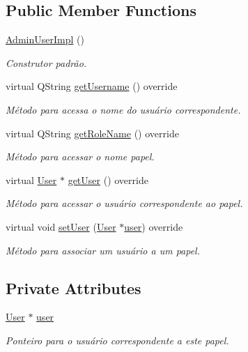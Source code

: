 \subsection*{Public Member Functions}
\begin{DoxyCompactItemize}
\item 
\hyperlink{classAdminUserImpl_a45371b972d5cd8feaa8c3cd592761f8c}{Admin\+User\+Impl} ()\hypertarget{classAdminUserImpl_a45371b972d5cd8feaa8c3cd592761f8c}{}\label{classAdminUserImpl_a45371b972d5cd8feaa8c3cd592761f8c}

\begin{DoxyCompactList}\small\item\em Construtor padrão. \end{DoxyCompactList}\item 
virtual Q\+String \hyperlink{classAdminUserImpl_af66494cfe7eecb1199cfc3295c009f2c}{get\+Username} () override
\begin{DoxyCompactList}\small\item\em Método para acessa o nome do usuário correspondente. \end{DoxyCompactList}\item 
virtual Q\+String \hyperlink{classAdminUserImpl_a8fc6881cf92e783065001be43209a5a6}{get\+Role\+Name} () override
\begin{DoxyCompactList}\small\item\em Método para acessar o nome papel. \end{DoxyCompactList}\item 
virtual \hyperlink{classUser}{User} $\ast$ \hyperlink{classAdminUserImpl_aa548616e5bf99062155ee397bf9be6ad}{get\+User} () override
\begin{DoxyCompactList}\small\item\em Método para acessar o usuário correspondente ao papel. \end{DoxyCompactList}\item 
virtual void \hyperlink{classAdminUserImpl_a5a392bdfba62518e31e40819fe3c32b7}{set\+User} (\hyperlink{classUser}{User} $\ast$\hyperlink{classAdminUserImpl_af88f707a7bd759f9613ab55c29767cc2}{user}) override
\begin{DoxyCompactList}\small\item\em Método para associar um usuário a um papel. \end{DoxyCompactList}\end{DoxyCompactItemize}
\subsection*{Private Attributes}
\begin{DoxyCompactItemize}
\item 
\hyperlink{classUser}{User} $\ast$ \hyperlink{classAdminUserImpl_af88f707a7bd759f9613ab55c29767cc2}{user}\hypertarget{classAdminUserImpl_af88f707a7bd759f9613ab55c29767cc2}{}\label{classAdminUserImpl_af88f707a7bd759f9613ab55c29767cc2}

\begin{DoxyCompactList}\small\item\em Ponteiro para o usuário correspondente a este papel. \end{DoxyCompactList}\end{DoxyCompactItemize}
